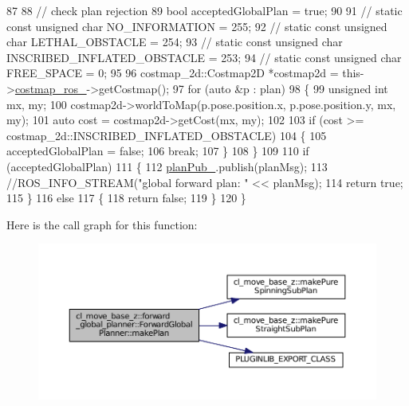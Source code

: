 \begin{DoxyCode}
87 
88     \textcolor{comment}{// check plan rejection}
89     \textcolor{keywordtype}{bool} acceptedGlobalPlan = \textcolor{keyword}{true};
90 
91     \textcolor{comment}{// static const unsigned char NO\_INFORMATION = 255;}
92     \textcolor{comment}{// static const unsigned char LETHAL\_OBSTACLE = 254;}
93     \textcolor{comment}{// static const unsigned char INSCRIBED\_INFLATED\_OBSTACLE = 253;}
94     \textcolor{comment}{// static const unsigned char FREE\_SPACE = 0;}
95 
96     costmap\_2d::Costmap2D *costmap2d = this->\hyperlink{classcl__move__base__z_1_1forward__global__planner_1_1ForwardGlobalPlanner_a711d4a0d92a216eb8cab3b42f18eb795}{costmap\_ros\_}->getCostmap();
97     \textcolor{keywordflow}{for} (\textcolor{keyword}{auto} &p : plan)
98     \{
99         \textcolor{keywordtype}{unsigned} \textcolor{keywordtype}{int} mx, my;
100         costmap2d->worldToMap(p.pose.position.x, p.pose.position.y, mx, my);
101         \textcolor{keyword}{auto} cost = costmap2d->getCost(mx, my);
102 
103         \textcolor{keywordflow}{if} (cost >= costmap\_2d::INSCRIBED\_INFLATED\_OBSTACLE)
104         \{
105             acceptedGlobalPlan = \textcolor{keyword}{false};
106             \textcolor{keywordflow}{break};
107         \}
108     \}
109 
110     \textcolor{keywordflow}{if} (acceptedGlobalPlan)
111     \{
112         \hyperlink{classcl__move__base__z_1_1forward__global__planner_1_1ForwardGlobalPlanner_a927dc6a687fac3751033d9736cf8dfcf}{planPub\_}.publish(planMsg);
113         \textcolor{comment}{//ROS\_INFO\_STREAM("global forward plan: " << planMsg);}
114         \textcolor{keywordflow}{return} \textcolor{keyword}{true};
115     \}
116     \textcolor{keywordflow}{else}
117     \{
118         \textcolor{keywordflow}{return} \textcolor{keyword}{false};
119     \}
120 \}
\end{DoxyCode}


Here is the call graph for this function\+:
\nopagebreak
\begin{figure}[H]
\begin{center}
\leavevmode
\includegraphics[width=350pt]{classcl__move__base__z_1_1forward__global__planner_1_1ForwardGlobalPlanner_a9d7c48877a390ca3cc580a7ffa50d316_cgraph}
\end{center}
\end{figure}




